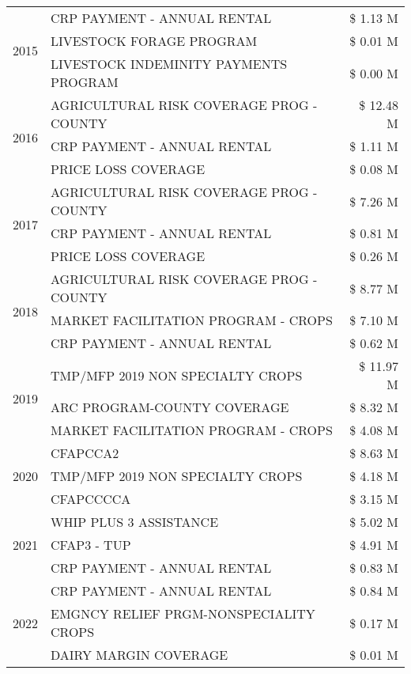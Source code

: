 \begin{tabular}{llr}
\cline{1-3}
\multirow[t]{3}{*}{2015} & CRP PAYMENT - ANNUAL RENTAL & \$ 1.13 M \\
 & LIVESTOCK FORAGE PROGRAM & \$ 0.01 M \\
 & LIVESTOCK INDEMINITY PAYMENTS PROGRAM & \$ 0.00 M \\
\cline{1-3}
\multirow[t]{3}{*}{2016} & AGRICULTURAL RISK COVERAGE PROG - COUNTY & \$ 12.48 M \\
 & CRP PAYMENT - ANNUAL RENTAL & \$ 1.11 M \\
 & PRICE LOSS COVERAGE & \$ 0.08 M \\
\cline{1-3}
\multirow[t]{3}{*}{2017} & AGRICULTURAL RISK COVERAGE PROG - COUNTY & \$ 7.26 M \\
 & CRP PAYMENT - ANNUAL RENTAL & \$ 0.81 M \\
 & PRICE LOSS COVERAGE & \$ 0.26 M \\
\cline{1-3}
\multirow[t]{3}{*}{2018} & AGRICULTURAL RISK COVERAGE PROG - COUNTY & \$ 8.77 M \\
 & MARKET FACILITATION PROGRAM - CROPS & \$ 7.10 M \\
 & CRP PAYMENT - ANNUAL RENTAL & \$ 0.62 M \\
\cline{1-3}
\multirow[t]{3}{*}{2019} & TMP/MFP 2019 NON SPECIALTY CROPS & \$ 11.97 M \\
 & ARC PROGRAM-COUNTY COVERAGE & \$ 8.32 M \\
 & MARKET FACILITATION PROGRAM - CROPS & \$ 4.08 M \\
\cline{1-3}
\multirow[t]{3}{*}{2020} & CFAPCCA2 & \$ 8.63 M \\
 & TMP/MFP 2019 NON SPECIALTY CROPS & \$ 4.18 M \\
 & CFAPCCCCA & \$ 3.15 M \\
\cline{1-3}
\multirow[t]{3}{*}{2021} & WHIP PLUS 3 ASSISTANCE & \$ 5.02 M \\
 & CFAP3 - TUP & \$ 4.91 M \\
 & CRP PAYMENT - ANNUAL RENTAL & \$ 0.83 M \\
\cline{1-3}
\multirow[t]{3}{*}{2022} & CRP PAYMENT - ANNUAL RENTAL & \$ 0.84 M \\
 & EMGNCY RELIEF PRGM-NONSPECIALITY CROPS & \$ 0.17 M \\
 & DAIRY MARGIN COVERAGE & \$ 0.01 M \\
\cline{1-3}
\bottomrule
\end{tabular}
